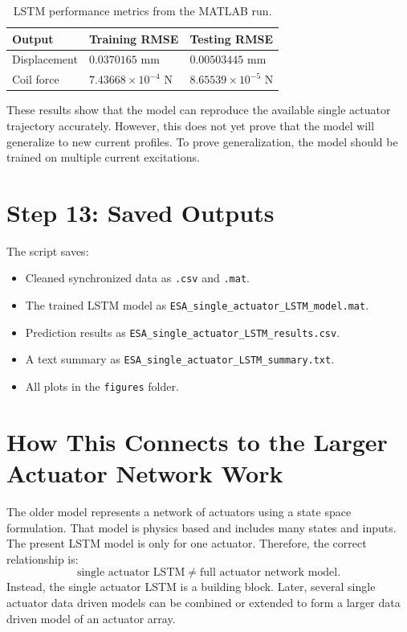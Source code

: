 \documentclass[11pt]{article}
\begin{document}
\begin{table}[H]
\centering
\caption{LSTM performance metrics from the MATLAB run.}
\begin{tabular}{lll}
\toprule
Output & Training RMSE & Testing RMSE \\
\midrule
Displacement & \(0.0370165\) mm & \(0.00503445\) mm \\
Coil force & \(7.43668 \times 10^{-4}\) N & \(8.65539 \times 10^{-5}\) N \\
\bottomrule
\end{tabular}
\end{table}

These results show that the model can reproduce the available single actuator trajectory accurately. However, this does not yet prove that the model will generalize to new current profiles. To prove generalization, the model should be trained on multiple current excitations.

\section{Step 13: Saved Outputs}

The script saves:
\begin{itemize}[leftmargin=1.2cm]
    \item Cleaned synchronized data as \texttt{.csv} and \texttt{.mat}.
    \item The trained LSTM model as \texttt{ESA\_single\_actuator\_LSTM\_model.mat}.
    \item Prediction results as \texttt{ESA\_single\_actuator\_LSTM\_results.csv}.
    \item A text summary as \texttt{ESA\_single\_actuator\_LSTM\_summary.txt}.
    \item All plots in the \texttt{figures} folder.
\end{itemize}

\section{How This Connects to the Larger Actuator Network Work}

The older model represents a network of actuators using a state space formulation. That model is physics based and includes many states and inputs. The present LSTM model is only for one actuator. Therefore, the correct relationship is:
\[
    \text{single actuator LSTM} \neq \text{full actuator network model}.
\]
Instead, the single actuator LSTM is a building block. Later, several single actuator data driven models can be combined or extended to form a larger data driven model of an actuator array.
\end{document}
